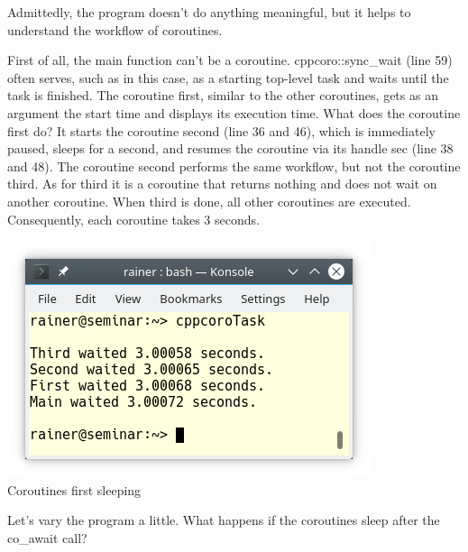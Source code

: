 Admittedly, the program doesn’t do anything meaningful, but it helps to understand the workflow of coroutines.

First of all, the main function can’t be a coroutine. cppcoro::sync\_wait (line 59) often serves, such as in this case, as a starting top-level task and waits until the task is finished. The coroutine first, similar to the other coroutines, gets as an argument the start time and displays its execution time. What does the coroutine first do? It starts the coroutine second (line 36 and 46), which is immediately paused, sleeps for a second, and resumes the coroutine via its handle sec (line 38 and 48). The coroutine second performs the same workflow, but not the coroutine third. As for third it is a coroutine that returns nothing and does not wait on another coroutine. When third is done, all other coroutines are executed. Consequently, each coroutine takes 3 seconds.

\begin{center}
\includegraphics[width=0.8\textwidth]{content/5/chapter8/images/1.png}\\
Coroutines first sleeping
\end{center}

Let’s vary the program a little. What happens if the coroutines sleep after the co\_await call?

